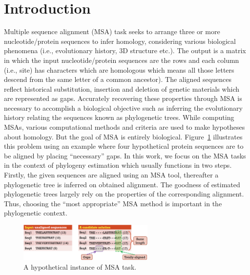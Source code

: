 \section{Introduction}
\label{sec:introducntion}
Multiple sequence alignment (MSA) task seeks to arrange three or more nucleotide/protein sequences to infer homology, considering various biological phenomena (i.e., evolutionary history, 3D structure etc.). The output is a matrix in which the input nucleotide/protein sequences are the rows and each column (i.e., site) has characters which are homologous which means all those letters descend from the same letter of a common ancestor). The aligned sequences reflect historical substitution, insertion and deletion of genetic materials which are represented as gaps. Accurately recovering these properties through MSA is necessary to accomplish a biological objective such as inferring the evolutionary history relating the sequences known as phylogenetic trees. While computing MSAs, various computational methods and criteria are used to make hypotheses about homology. But the goal of MSA is entirely biological. Figure~\ref{fig:msa_io} illustrates this problem using an example where four hypothetical protein sequences are to be aligned by placing ``necessary'' gaps. In this work, we focus on the MSA tasks in the context of phylogeny estimation which usually functions in two steps. Firstly, the given sequences are aligned using an MSA tool, thereafter a phylogenetic tree is inferred on obtained alignment. The goodness of estimated phylogenetic trees largely rely on the properties of the corresponding alignment. Thus, choosing the ``most appropriate'' MSA method  is important in the phylogenetic context.

\begin{figure}[!htbp]
	\centering
\includegraphics[width=0.6\textwidth]{Figure/msa_io}
\caption{A hypothetical instance of MSA task.} 
		\label{fig:msa_io}
\end{figure}

